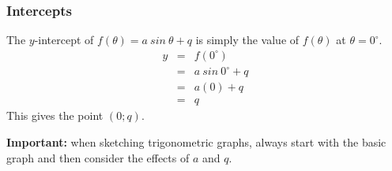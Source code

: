 \subsubsection*{Intercepts}
\nopagebreak
The $y$-intercept of $f(\theta )=a~sin~\theta+q$ is simply the value of $f(\theta )$ at $\theta =0^{\circ }$.
\begin{eqnarray*}
  y & = & f(0^{\circ }) \\
    & = & a~sin~ 0^{\circ } + q \\
    & = & a(0) + q \\
    & = & q
\end{eqnarray*}
This gives the point $(0;q)$.
\par
\textbf{Important:} when sketching trigonometric graphs, always start with the basic graph and then consider the effects of $a$ and $q$.
\vspace*{-20pt}
